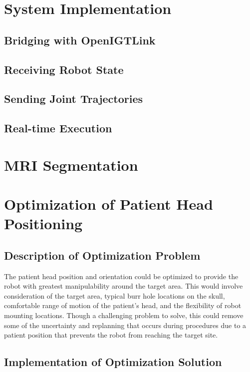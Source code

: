 \documentclass[12pt]{report}
\begin{document}
\chapter{System Implementation}
\section{Bridging with OpenIGTLink}
\section{Receiving Robot State}
\section{Sending Joint Trajectories}
\section{Real-time Execution}

\chapter{MRI Segmentation}

\chapter{Optimization of Patient Head Positioning}
\section{Description of Optimization Problem}
The patient head position and orientation could be optimized to provide the robot with greatest manipulability around the target area. This would involve consideration of the target area, typical burr hole locations on the skull, comfortable range of motion of the patient’s head, and the flexibility of robot mounting locations. Though a challenging problem to solve, this could remove some of the uncertainty and replanning that occurs during procedures due to a patient position that prevents the robot from reaching the target site.
\section{Implementation of Optimization Solution}
\end{document}
